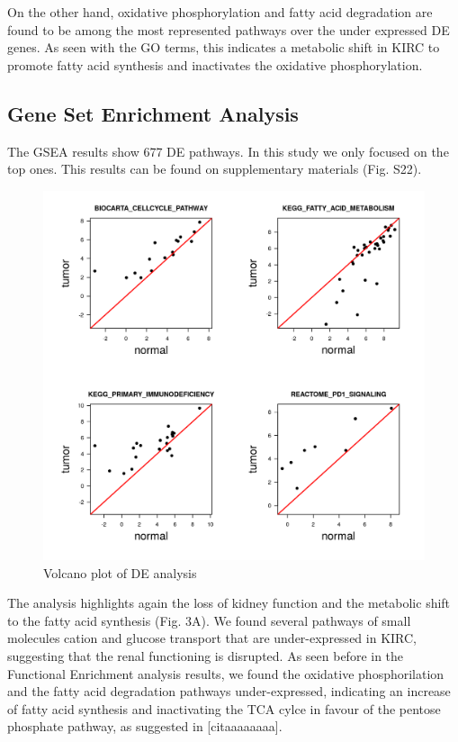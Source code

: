 \documentclass[9pt,twocolumn,twoside]{gsajnl}
\begin{document}
On the other hand, oxidative phosphorylation and fatty acid degradation are found to be among the most represented pathways over the under expressed DE genes. As seen with the GO terms, this indicates a metabolic shift in KIRC to promote fatty acid synthesis and inactivates the oxidative phosphorylation.

\subsection*{Gene Set Enrichment Analysis}
The GSEA results show 677 DE pathways. In this study we only focused on the top ones. This results can be found on supplementary materials (Fig. S22).
\begin{figure}[htbp]
\centering
\includegraphics[width=\linewidth]{figures/fig3.png}
\caption{Volcano plot of DE analysis }%
\label{fig:spectrum}
\end{figure}

The analysis highlights again the loss of kidney function and the metabolic shift to the fatty acid synthesis  (Fig. 3A). We found several pathways of small molecules cation and glucose transport that are under-expressed in KIRC, suggesting that the renal functioning is disrupted. As seen before in the Functional Enrichment analysis results, we found the oxidative phosphorilation and the fatty acid degradation pathways under-expressed, indicating an increase of fatty acid synthesis and inactivating the TCA cylce in favour of the pentose phosphate pathway, as suggested in [citaaaaaaaa]. 
\end{document}
